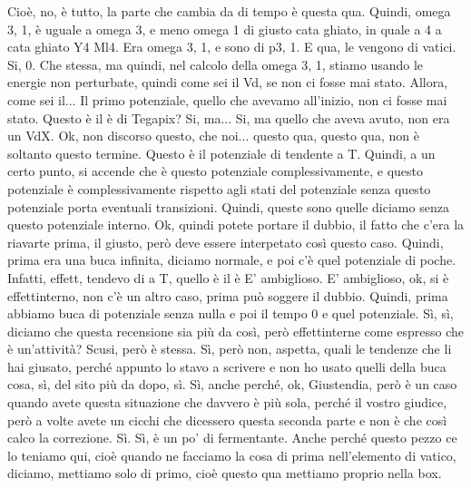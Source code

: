 \begin{soluzione}
{Cioè, no, è tutto, la parte che cambia da di tempo è questa qua. Quindi, omega 3, 1, è uguale a omega 3, e meno omega 1 di giusto cata ghiato, in quale a 4 a cata ghiato Y4 Ml4. Era omega 3, 1, e sono di p3, 1. E qua, le vengono di vatici. Si, 0. Che stessa, ma quindi, nel calcolo della omega 3, 1, stiamo usando le energie non perturbate, quindi come sei il Vd, se non ci fosse mai stato. Allora, come sei il... Il primo potenziale, quello che avevamo all'inizio, non ci fosse mai stato. Questo è il è di Tegapix? Si, ma... Si, ma quello che aveva avuto, non era un VdX. Ok, non discorso questo, che noi... questo qua, questo qua, non è soltanto questo termine. Questo è il potenziale di tendente a T. Quindi, a un certo punto, si accende che è questo potenziale complessivamente, e questo potenziale è complessivamente rispetto agli stati del potenziale senza questo potenziale porta eventuali transizioni. Quindi, queste sono quelle diciamo senza questo potenziale interno. Ok, quindi potete portare il dubbio, il fatto che c'era la riavarte prima, il giusto, però deve essere interpetato così questo caso. Quindi, prima era una buca infinita, diciamo normale, e poi c'è quel potenziale di poche. Infatti, effett, tendevo di a T, quello è il è E' ambiglioso. E' ambiglioso, ok, si è effettinterno, non c'è un altro caso, prima può soggere il dubbio. Quindi, prima abbiamo buca di potenziale senza nulla e poi il tempo 0 e quel potenziale. Sì, sì, diciamo che questa recensione sia più da così, però effettinterne come espresso che è un'attività? Scusi, però è stessa. Sì, però non, aspetta, quali le tendenze che li hai giusato, perché appunto lo stavo a scrivere e non ho usato quelli della buca cosa, sì, del sito più da dopo, sì. Sì, anche perché, ok, Giustendia, però è un caso quando avete questa situazione che davvero è più sola, perché il vostro giudice, però a volte avete un cicchi che dicessero questa seconda parte e non è che così calco la correzione. Sì. Sì, è un po' di fermentante. Anche perché questo pezzo ce lo teniamo qui, cioè quando ne facciamo la cosa di prima nell'elemento di vatico, diciamo, mettiamo solo di primo, cioè questo qua mettiamo proprio nella box. 
   
}
\end{soluzione}
